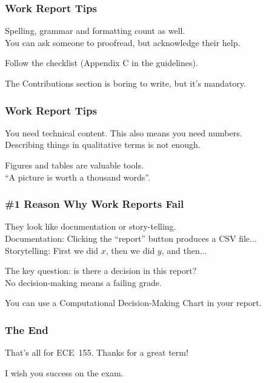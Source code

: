 \begin{frame}
\frametitle{Work Report Tips}

Spelling, grammar and formatting count as well.\\
	\quad You can ask someone to proofread, but acknowledge their help.
	
Follow the checklist (Appendix C in the guidelines).

The Contributions section is boring to write, but it's mandatory.

\end{frame}

\begin{frame}
\frametitle{Work Report Tips}

You need technical content. This also means you need numbers.\\
	\quad Describing things in qualitative terms is not enough.

Figures and tables are valuable tools.\\
	\quad ``A picture is worth a thousand words''.

\end{frame}


\begin{frame}
\frametitle{\#1 Reason Why Work Reports Fail}

They look like documentation or story-telling.\\
	\quad Documentation: Clicking the ``report'' button produces a CSV file...\\
	\quad Storytelling: First we did $x$, then we did $y$, and then...

The key question: is there a decision in this report?\\
	\quad No decision-making means a failing grade.
	
You can use a Computational Decision-Making Chart in your report.

\end{frame}


\begin{frame}
\frametitle{The End}

That's all for ECE~155. Thanks for a great term!

I wish you success on the exam.

\end{frame}





